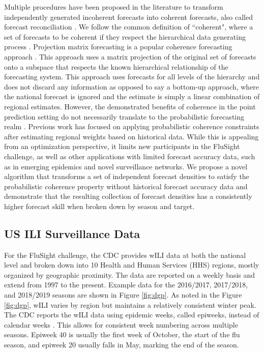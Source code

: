 \documentclass{umassthesis}          %
\begin{document}
Multiple procedures have been proposed in the literature to transform independently generated incoherent forecasts into coherent forecasts, also called forecast reconciliation \cite{taieb2017coherent} \cite{wickramasuriya2015forecasting}. We follow the common definition of ``coherent", where a set of forecasts to be coherent if they respect the hierarchical data generating process  \cite{taieb2017coherent}. Projection matrix forecasting is a popular coherence forecasting approach \cite{taieb2017coherent}. This approach uses a matrix projection of the original set of forecasts onto a subspace that respects the known hierarchical relationship of the forecasting system. This approach uses forecasts for all levels of the hierarchy and does not discard any information as opposed to say a bottom-up approach, where the national forecast is ignored and the estimate is simply a linear combination of regional estimates. However, the demonstrated benefits of coherence in the point prediction setting do not necessarily translate to the probabilistic forecasting realm \cite{wickramasuriya2015forecasting}. Previous work has focused on applying probabilistic coherence constraints after estimating regional weights based on historical data. While this is appealing from an optimization perspective, it limits new participants in the FluSight challenge, as well as other applications with limited forecast accuracy data, such as in emerging epidemics and novel surveillance networks. We propose a novel algorithm that transforms a set of independent forecast densities to satisfy the probabilistic coherence property without historical forecast accuracy data and demonstrate that the resulting collection of forecast densities has a consistently higher forecast skill when broken down by season and target.


\subsection{US ILI Surveillance Data}
For the FluSight challenge, the CDC provides wILI data at both the national level and broken down into 10 Health and Human Services (HHS) regions, mostly organized by geographic proximity. The data are reported on a weekly basis and extend from 1997 to the present. Example data for the 2016/2017, 2017/2018, and 2018/2019 seasons are shown in Figure \ref{fig:dgp}. As noted in the Figure \ref{fig:dgp}, wILI varies by region but maintains a relatively consistent winter peak. The CDC reports the wILI data using epidemic weeks, called epiweeks, instead of calendar weeks \cite{epiweeks}. This allows for consistent week numbering across multiple seasons. Epiweek 40 is usually the first week of October, the start of the flu season, and epiweek 20 usually falls in May, marking the end of the season.
\end{document}
